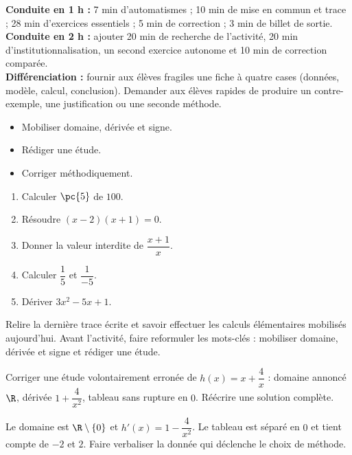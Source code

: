 \ifmxteacher
\begin{method}
\textbf{Conduite en 1 h :} 7 min d'automatismes ; 10 min de mise en commun et trace ; 28 min d'exercices essentiels ; 5 min de correction ; 3 min de billet de sortie.\\
\textbf{Conduite en 2 h :} ajouter 20 min de recherche de l'activité, 20 min d'institutionnalisation, un second exercice autonome et 10 min de correction comparée.\\
\textbf{Différenciation :} fournir aux élèves fragiles une fiche à quatre cases (données, modèle, calcul, conclusion). Demander aux élèves rapides de produire un contre-exemple, une justification ou une seconde méthode.
\end{method}
\fi
{}
\begin{objectives}\begin{itemize}\item Mobiliser domaine, dérivée et signe.\item Rédiger une étude.\item Corriger méthodiquement.\end{itemize}\end{objectives}
\begin{fluency}\begin{enumerate}\item Calculer $\pc{5}$ de $100$. \item Résoudre $(x-2)(x+1)=0$. \item Donner la valeur interdite de $\dfrac{x+1}{x}$. \item Calculer $\dfrac1{5}$ et $\dfrac1{-5}$. \item Dériver $3x^2-5x+1$. \end{enumerate}\end{fluency}
\begin{prerequisites}Relire la dernière trace écrite et savoir effectuer les calculs élémentaires mobilisés aujourd'hui. Avant l'activité, faire reformuler les mots-clés : mobiliser domaine, dérivée et signe et rédiger une étude.\end{prerequisites}

\begin{activity}
Corriger une étude volontairement erronée de $h(x)=x+\dfrac4x$ : domaine annoncé $\R$, dérivée $1+\dfrac4{x^2}$, tableau sans rupture en $0$. Réécrire une solution complète.

\end{activity}
\begin{solution}Le domaine est $\R\setminus\{0\}$ et $h'(x)=1-\dfrac4{x^2}$. Le tableau est séparé en $0$ et tient compte de $-2$ et $2$. Faire verbaliser la donnée qui déclenche le choix de méthode.\end{solution}

